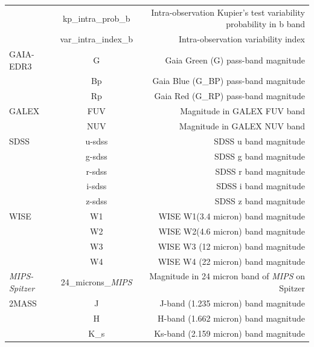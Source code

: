 \documentclass[fleqn,usenatbib]{mnras}
\begin{document}
\begin{table}
\begin{tabular}{lcr}
         & kp\_intra\_prob\_b   & Intra-observation Kupier's test variability probability in b band   \\
                     & var\_intra\_index\_b & Intra-observation variability index                       \\ 
    GAIA-EDR3             & G                    & Gaia Green (G) pass-band magnitude                        \\
                     & Bp                   & Gaia Blue (G\_BP) pass-band magnitude                     \\
                     & Rp                   & Gaia Red (G\_RP) pass-band magnitude                      \\ 
                     
    GALEX            & FUV                  & Magnitude in GALEX FUV band                               \\
                     & NUV                  & Magnitude in GALEX NUV band                               \\ 
    SDSS             & u-sdss               & SDSS u band magnitude                                     \\
                     & g-sdss               & SDSS g band magnitude                                     \\
                     & r-sdss               & SDSS r band magnitude                                     \\
                     & i-sdss               & SDSS i band magnitude                                     \\
                     & z-sdss               & SDSS z band magnitude                                     \\ 
    WISE             & W1                   & WISE W1(3.4 micron) band magnitude                        \\
                     & W2                   & WISE W2(4.6 micron) band magnitude                        \\
                     & W3                   & WISE W3 (12 micron) band magnitude                        \\
                     & W4                   & WISE W4 (22 micron) band magnitude                        \\ 
    {\em MIPS-Spitzer} & 24\_microns\_{\em MIPS}  & Magnitude in 24 micron band of {\em MIPS} on Spitzer                      \\ 
    2MASS            & J                    & J-band (1.235 micron) band magnitude                      \\
                     & H                    & H-band (1.662 micron) band magnitude                      \\
                     & K\_s                    & Ks-band (2.159 micron) band magnitude                     \\ 
    

\end{tabular}
\end{table}
\end{document}
